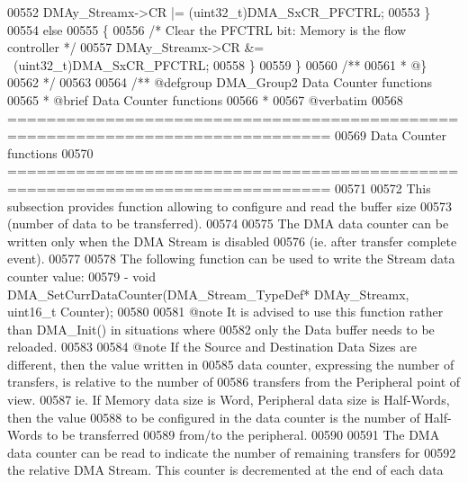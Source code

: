 \begin{DoxyCode}
00552     DMAy\_Streamx->CR |= (uint32\_t)DMA_SxCR_PFCTRL;
00553   \}
00554   \textcolor{keywordflow}{else}
00555   \{
00556     \textcolor{comment}{/* Clear the PFCTRL bit: Memory is the flow controller */}
00557     DMAy\_Streamx->CR &= ~(uint32\_t)DMA_SxCR_PFCTRL;
00558   \}
00559 \}
00560 \textcolor{comment}{/**}
00561 \textcolor{comment}{  * @\}}
00562 \textcolor{comment}{  */}
00563 
00564 \textcolor{comment}{/** @defgroup DMA\_Group2 Data Counter functions}
00565 \textcolor{comment}{ *  @brief   Data Counter functions }
00566 \textcolor{comment}{ *}
00567 \textcolor{comment}{@verbatim   }
00568 \textcolor{comment}{ ===============================================================================}
00569 \textcolor{comment}{                           Data Counter functions}
00570 \textcolor{comment}{ ===============================================================================  }
00571 \textcolor{comment}{}
00572 \textcolor{comment}{  This subsection provides function allowing to configure and read the buffer size}
00573 \textcolor{comment}{  (number of data to be transferred). }
00574 \textcolor{comment}{}
00575 \textcolor{comment}{  The DMA data counter can be written only when the DMA Stream is disabled }
00576 \textcolor{comment}{  (ie. after transfer complete event).}
00577 \textcolor{comment}{}
00578 \textcolor{comment}{  The following function can be used to write the Stream data counter value:}
00579 \textcolor{comment}{    - void DMA\_SetCurrDataCounter(DMA\_Stream\_TypeDef* DMAy\_Streamx, uint16\_t Counter);}
00580 \textcolor{comment}{}
00581 \textcolor{comment}{@note It is advised to use this function rather than DMA\_Init() in situations where}
00582 \textcolor{comment}{      only the Data buffer needs to be reloaded.}
00583 \textcolor{comment}{}
00584 \textcolor{comment}{@note If the Source and Destination Data Sizes are different, then the value written in}
00585 \textcolor{comment}{      data counter, expressing the number of transfers, is relative to the number of }
00586 \textcolor{comment}{      transfers from the Peripheral point of view.}
00587 \textcolor{comment}{      ie. If Memory data size is Word, Peripheral data size is Half-Words, then the value}
00588 \textcolor{comment}{      to be configured in the data counter is the number of Half-Words to be transferred}
00589 \textcolor{comment}{      from/to the peripheral.}
00590 \textcolor{comment}{}
00591 \textcolor{comment}{  The DMA data counter can be read to indicate the number of remaining transfers for}
00592 \textcolor{comment}{  the relative DMA Stream. This counter is decremented at the end of each data }

\end{DoxyCode}
